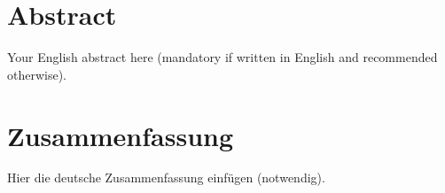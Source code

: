 \documentclass[12pt,final,twoside]{report}
\theoremstyle{plain}
\theoremstyle{definition}
\theoremstyle{remark}
\begin{document}
\thispagestyle{empty}
\hspace{1cm}
\newpage

\section*{Abstract}\label{sec:abstract}
Your English abstract here (mandatory if written in English and recommended otherwise).

\vfill
\section*{Zusammenfassung}\label{sec:zusammenfassung}
Hier die deutsche Zusammenfassung einf\"ugen (notwendig).

\cleardoublepage

\tableofcontents
\cleardoublepage
\listoffigures
\cleardoublepage
{}
\listoftables
\cleardoublepage

\fancyhead[LE]{\it \leftmark}           %
\fancyhead[RO]{\it \rightmark}          %
\fancyhead[LO,RE]{}                     %



\cleardoublepage


\cleardoublepage


\cleardoublepage


\cleardoublepage


\cleardoublepage
\end{document}
